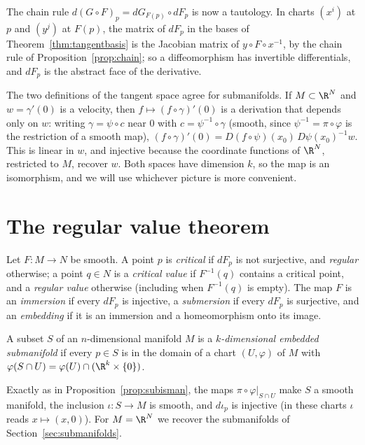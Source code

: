 The chain rule $d(G\circ F)_p=dG_{F(p)}\circ dF_p$ is now a tautology. In charts $(x^i)$ at $p$ and $(y^j)$ at $F(p)$, the matrix of $dF_p$ in the bases of
Theorem~\ref{thm:tangentbasis} is the Jacobian matrix of $y\circ F\circ x^{-1}$, by the chain rule of Proposition~\ref{prop:chain}; so a diffeomorphism has
invertible differentials, and $dF_p$ is the abstract face of the derivative.

The two definitions of the tangent space agree for submanifolds. If $M\subset\R^N$ and $w=\gamma'(0)$ is a velocity, then $f\mapsto(f\circ\gamma)'(0)$ is a
derivation that depends only on $w$: writing $\gamma=\psi\circ c$ near $0$ with $c=\psi^{-1}\circ\gamma$ (smooth, since $\psi^{-1}=\pi\circ\varphi$ is the
restriction of a smooth map), $(f\circ\gamma)'(0)=D(f\circ\psi)(x_0)\,D\psi(x_0)^{-1}w$. This is linear in $w$, and injective because the coordinate
functions of $\R^N$, restricted to $M$, recover $w$. Both spaces have dimension $k$, so the map is an isomorphism, and we will use whichever picture is
more convenient.

\section{The regular value theorem}

\begin{definition}
Let $F\colon M\to N$ be smooth. A point $p$ is \emph{critical} if $dF_p$ is not surjective, and \emph{regular} otherwise; a point $q\in N$ is a
\emph{critical value} if $F^{-1}(q)$ contains a critical point, and a \emph{regular value} otherwise (including when $F^{-1}(q)$ is empty). The map $F$ is
an \emph{immersion} if every $dF_p$ is injective, a \emph{submersion} if every $dF_p$ is surjective, and an \emph{embedding} if it is an immersion and a
homeomorphism onto its image.
\end{definition}

\begin{definition}
A subset $S$ of an $n$-dimensional manifold $M$ is a \emph{$k$-dimensional embedded submanifold} if every $p\in S$ is in the domain of a chart $(U,\varphi)$
of $M$ with $\varphi(S\cap U)=\varphi(U)\cap(\R^k\times\{0\})$.
\end{definition}

Exactly as in Proposition~\ref{prop:subisman}, the maps $\pi\circ\varphi|_{S\cap U}$ make $S$ a smooth manifold, the inclusion $\iota\colon S\to M$ is smooth, and
$d\iota_p$ is injective (in these charts $\iota$ reads $x\mapsto(x,0)$). For $M=\R^N$ we recover the submanifolds of Section~\ref{sec:submanifolds}.

